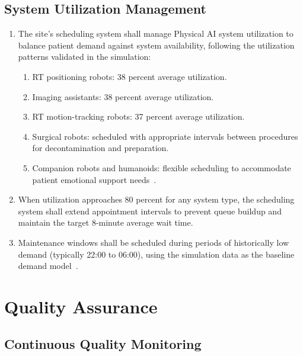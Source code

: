 \subsection{System Utilization Management}

\begin{enumerate}[label=(\alph*)]
\item The site's scheduling system shall manage Physical AI system utilization
  to balance patient demand against system availability, following the
  utilization patterns validated in the simulation:
  \begin{enumerate}[label=(\arabic*)]
  \item RT positioning robots: 38 percent average utilization.
  \item Imaging assistants: 38 percent average utilization.
  \item RT motion-tracking robots: 37 percent average utilization.
  \item Surgical robots: scheduled with appropriate intervals between
    procedures for decontamination and preparation.
  \item Companion robots and humanoids: flexible scheduling to accommodate
    patient emotional support needs~\cite{newtrial2026}.
  \end{enumerate}

\item When utilization approaches 80 percent for any system type, the
  scheduling system shall extend appointment intervals to prevent queue
  buildup and maintain the target 8-minute average wait time.

\item Maintenance windows shall be scheduled during periods of historically
  low demand (typically 22:00 to 06:00), using the simulation data as the
  baseline demand model~\cite{newtrial2026}.
\end{enumerate}

\section{Quality Assurance}

\subsection{Continuous Quality Monitoring}

